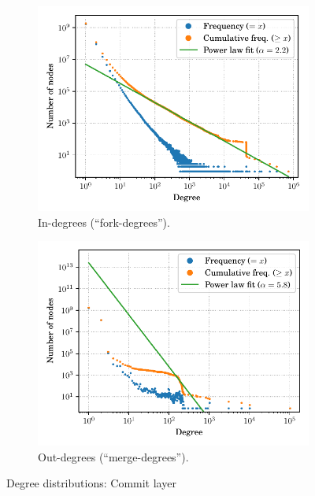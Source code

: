 \begin{figure}
    \begin{subfigure}{.49\textwidth}
        \centering
        \includegraphics[width=\linewidth]{img/topology/inout/rev_in}
        \caption{In-degrees (``fork-degrees'').}%
        \label{fig:inout_in_rev}
    \end{subfigure}\hfill%
    \begin{subfigure}{.49\textwidth}
        \centering%
        \includegraphics[width=\linewidth]{img/topology/inout/rev_out}
        \caption{Out-degrees (``merge-degrees'').}%
        \label{fig:inout_out_rev}
    \end{subfigure}
    \caption{Degree distributions: Commit layer}%
    \label{fig:inout_rev}
\end{figure}

